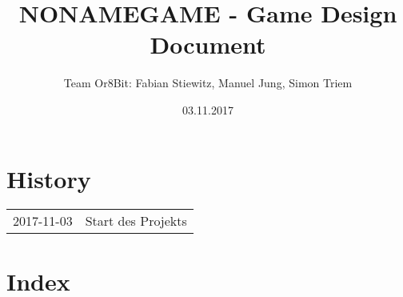 \documentclass[a4paper,12pt]{book}
\title{NONAMEGAME - Game Design Document}
\author{Team Or8Bit: Fabian Stiewitz, Manuel Jung, Simon Triem}
\date{03.11.2017}
\begin{document}
\frontmatter
\maketitle
\tableofcontents
\listoffigures
\mainmatter









\appendix

\chapter{History}
\begin{tabularx}{\textwidth}{ l X }
  2017-11-03 & Start des Projekts \\
\end{tabularx}
\backmatter
\chapter{Index}
\printindex
\end{document}
